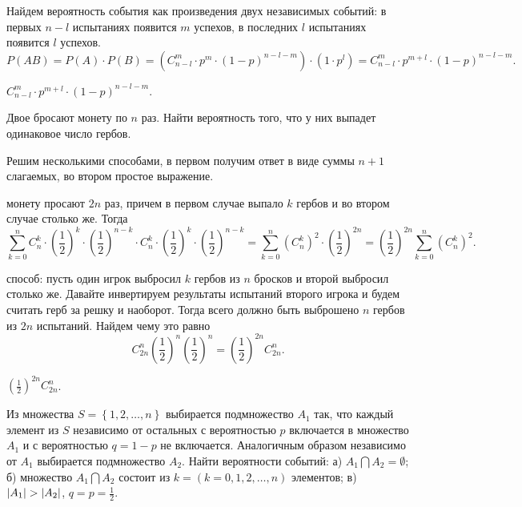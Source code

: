 \begin{solution}
Найдем вероятность события как произведения двух независимых событий: в первых $n - l$ испытаниях появится $m$ успехов,
в последних  $l$ испытаниях появится $l$ успехов.
\[
  P(AB) = P(A) \cdot P(B) = \left(C_{n - l}^m \cdot p^m \cdot (1 - p)^{n - l - m}\right) \cdot 
  \left(1 \cdot p^l\right) = C_{n - l}^m \cdot  p^{m + l} \cdot (1 - p)^{n - l -m }
.\] 
\end{solution}

\begin{result}
$C_{n - l}^m \cdot  p^{m + l} \cdot (1 - p)^{n - l -m }$.
\end{result}

\medskip
\begin{task}{10}
Двое бросают монету по $n$ раз. Найти вероятность того, что у них выпадет одинаковое число гербов.
\end{task}

\begin{solution}
Решим несколькими способами, в первом получим ответ в виде суммы $n + 1$ слагаемых, во втором простое выражение.

\medskip
{} монету просают $2n$ раз, причем в первом случае выпало $k$ гербов и во втором случае столько же. Тогда
\[
  \sum_{k = 0}^n C_n^k \cdot \left(\frac{1}{2}\right)^k \cdot \left(\frac{1}{2}\right)^{n - k} \cdot 
  C_n^k \cdot \left(\frac{1}{2}\right)^k \cdot \left(\frac{1}{2}\right)^{n - k} = 
  \sum_{k = 0}^n \left(C_n^k\right)^2 \cdot  \left(\frac{1}{2}\right)^{2n} =  \left(\frac{1}{2}\right)^{2n} \sum_{k = 0}^n \left(C_n^k\right)^2
.\] 

\bigskip
{} способ: пусть один игрок выбросил $k$ гербов из $n$ бросков и  второй выбросил столько же. Давайте
инвертируем результаты испытаний второго игрока и будем считать герб за решку и наоборот. Тогда всего должно быть выброшено $n$ гербов из $2n$ испытаний.
Найдем чему это равно
\[
  C_{2n}^n \left(\frac{1}{2}\right)^n \left(\frac{1}{2}\right)^n = \left(\frac{1}{2}\right)^{2n} C_{2n}^n
.\] 
\end{solution}

\begin{result}
$\left(\frac{1}{2}\right)^{2n} C_{2n}^n$.
\end{result}

\medskip
\begin{task}{11}
Из множества $S = \left\{1, 2, \ldots, n\right\}$ выбирается подмножество $A_1$ так, что каждый 
элемент из $S$ независимо от остальных с вероятностью $p$ включается в множество $A_1$ и с вероятностью
$q = 1- p$ не включается. Аналогичным образом независимо от $A_1$ выбирается подмножество $A_2$. Найти вероятности событий: а)
$A_1 \bigcap A_2 = \emptyset$; б) множество $A_1 \bigcap A_2$ состоит из $k = \left(k = 0, 1, 2, \ldots, n\right)$ 
элементов; в) $\left\lvert A_1\right\rvert > \left\lvert A_2\right\rvert$, $q = p = \frac{1}{2}$.
\end{task}

